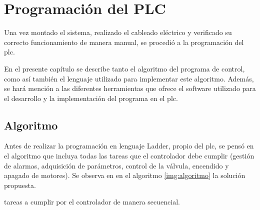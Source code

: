 \chapter{Programación del PLC}
\label{ch:progPLC}

Una vez montado el sistema, realizado el cableado eléctrico y verificado su
correcto funcionamiento de
manera manual, se procedió a la programación del \gls{plc}.

En el presente capítulo se describe tanto el algoritmo del programa de control,
como así también el lenguaje utilizado para implementar este algoritmo.
Además, se hará mención a las diferentes herramientas que ofrece el software
utilizado para el desarrollo y la implementación del programa en el \gls{plc}.

\section{Algoritmo}
\label{sec:Algoritmo}
Antes de realizar la programación en lenguaje Ladder, propio del \gls{plc},
se pensó en el algoritmo que incluya todas las tareas que el
controlador debe cumplir (gestión de alarmas, adquisición de parámetros,
control de la válvula, encendido y apagado de motores).
Se observa en en el algoritmo \ref{img:algoritmo} la solución propuesta.

\begin{algorithm}[!ht]
 \small
 \caption{tareas a cumplir por el controlador de manera secuencial.}
 \label{img:algoritmo}
\end{algorithm}

